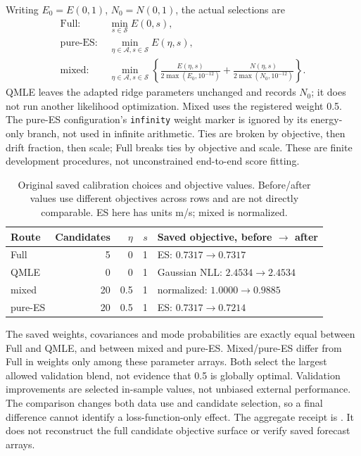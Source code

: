 \documentclass[11pt]{article}
\begin{document}
Writing \(E_0=E(0,1)\), \(N_0=N(0,1)\), the actual selections are
\begin{equation}
\begin{aligned}
\text{Full: }&\min_{s\in\mathcal S} E(0,s),\\
\text{pure-ES: }&\min_{\eta\in\mathcal A,s\in\mathcal S}E(\eta,s),\\
\text{mixed: }&\min_{\eta\in\mathcal A,s\in\mathcal S}
 \left\{\frac{E(\eta,s)}{2\max(E_0,10^{-12})}
       +\frac{N(\eta,s)}{2\max(N_0,10^{-12})}\right\}.
\end{aligned}
\label{eq:estimator-objectives}
\end{equation}
QMLE leaves the adapted ridge parameters unchanged and records \(N_0\);
it does not run another likelihood optimization. Mixed uses the registered
weight 0.5. The pure-ES configuration's \texttt{infinity} weight marker is
ignored by its energy-only branch, not used in infinite arithmetic.
Ties are broken by objective, then drift fraction, then scale; Full breaks
ties by objective and scale. These are finite development procedures, not
unconstrained end-to-end score fitting.

\begin{table}[htbp]
\centering\small
\caption{Original saved calibration choices and objective values.
Before/after values use different objectives across rows and are not
directly comparable. ES here has units m/s; mixed is normalized.}
\label{tab:estimator-calibration}
\begin{tabular}{lrrrl}
\toprule
Route & Candidates & \(\eta\) & \(s\) & Saved objective, before \(\to\) after\\
\midrule
Full & 5 & 0 & 1 & ES: \(0.7317\to0.7317\)\\
QMLE & 0 & 0 & 1 & Gaussian NLL: \(2.4534\to2.4534\)\\
mixed & 20 & 0.5 & 1 & normalized: \(1.0000\to0.9885\)\\
pure-ES & 20 & 0.5 & 1 & ES: \(0.7317\to0.7214\)\\
\bottomrule
\end{tabular}
\end{table}

The saved weights, covariances and mode probabilities are exactly equal
between Full and QMLE, and between mixed and pure-ES. Mixed/pure-ES differ
from Full in weights only among these parameter arrays. Both select the
largest allowed validation blend, not evidence that 0.5 is globally optimal.
Validation improvements are selected in-sample values, not unbiased external
performance. The comparison changes both data use and candidate selection,
so a final difference cannot identify a loss-function-only effect.
The aggregate receipt is
.
It does not reconstruct the full candidate objective surface or verify
saved forecast arrays.
\end{document}
